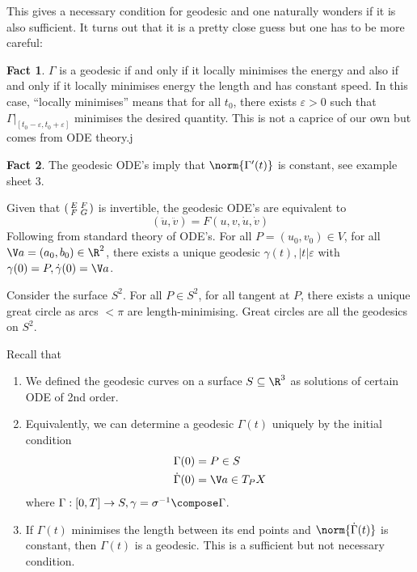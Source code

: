 \documentclass[a4paper]{article}
\theoremstyle{definition}
\newtheorem*{fact}{Fact}
\begin{document}
This gives a necessary condition for geodesic and one naturally wonders if it is also sufficient. It turns out that it is a pretty close guess but one has to be more careful:

\begin{fact}
  \(\Gamma\) is a geodesic if and only if it locally minimises the energy and also if and only if it locally minimises energy the length and has constant speed. In this case, ``locally minimises'' means that for all \(t_0\), there exists \(\varepsilon > 0\) such that \(\Gamma|_{[t_0 - \varepsilon, t_0 + \varepsilon]}\) minimises the desired quantity. This is not a caprice of our own but comes from ODE theory.j
\end{fact}

\begin{fact}
  The geodesic ODE's imply that \(\norm{\Gamma'(t)}\) is constant, see example sheet 3.
\end{fact}

\begin{remark}
  Given that \(\begin{psmallmatrix} E & F \\ F & G \end{psmallmatrix}\) is invertible, the geodesic ODE's are equivalent to
  \[
    (\ddot u, \ddot v) = F(u, v, \dot u, \dot v)
  \]
  Following from standard theory of ODE's. For all \(P = (u_0, v_0) \in V\), for all \(\V a = (a_0, b_0) \in \R^2\), there exists a unique geodesic \(\gamma(t), |t| \varepsilon\) with \(\gamma(0) = P, \dot \gamma(0) = \V a\).
\end{remark}

\begin{eg}
  Consider the surface \(S^2\). For all \(P \in S^2\), for all tangent at \(P\), there exists a unique great circle as arcs \(< \pi\) are length-minimising. Great circles are all the geodesics on \(S^2\).
\end{eg}

Recall that
\begin{enumerate}
\item We defined the geodesic curves on a surface \(S \subseteq \R^3\) as solutions of certain ODE of 2nd order.
\item Equivalently, we can determine a geodesic \(\Gamma(t)\) uniquely by the initial condition
\begin{align*}
  \Gamma(0) &= P \in S \\
  \dot \Gamma(0) &= \V a \in T_PX
\end{align*}
where \(\Gamma: [0, T] \to S, \gamma = \sigma^{-1} \compose \Gamma\).
\item If \(\Gamma(t)\) minimises the length between its end points and \(\norm{\dot \Gamma(t)}\) is constant, then \(\Gamma(t)\) is a geodesic. This is a sufficient but not necessary condition.
\end{enumerate}
\end{document}
